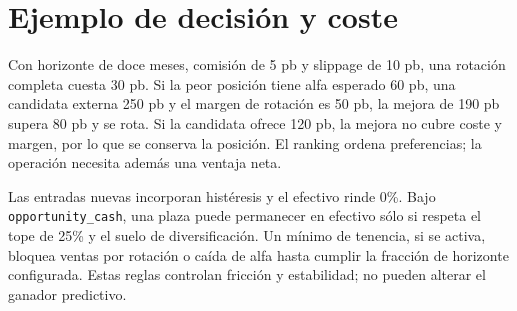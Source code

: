 \section{Ejemplo de decisión y coste}

Con horizonte de doce meses, comisión de 5 pb y slippage de 10 pb, una rotación completa cuesta 30
pb. Si la peor posición tiene alfa esperado 60 pb, una candidata externa 250 pb y el margen de
rotación es 50 pb, la mejora de 190 pb supera 80 pb y se rota. Si la candidata ofrece 120 pb, la
mejora no cubre coste y margen, por lo que se conserva la posición. El ranking ordena preferencias;
la operación necesita además una ventaja neta.

Las entradas nuevas incorporan histéresis y el efectivo rinde 0\%. Bajo
\texttt{opportunity\_cash}, una plaza puede permanecer en efectivo sólo si respeta el tope de 25\%
y el suelo de diversificación. Un mínimo de tenencia, si se activa, bloquea ventas por rotación o
caída de alfa hasta cumplir la fracción de horizonte configurada. Estas reglas controlan fricción y
estabilidad; no pueden alterar el ganador predictivo.
